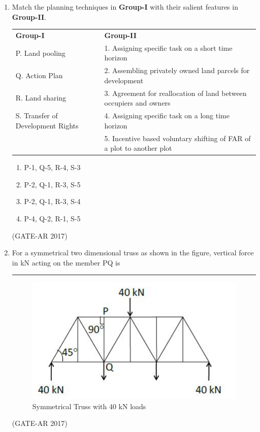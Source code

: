 \documentclass[a4paper,10pt]{article}
\begin{document}
\begin{enumerate}
    \item Match the planning techniques in \textbf{Group-I} with their salient features in \textbf{Group-II}. \\
    \begin{tabular}{ l l }
	\textbf{Group-I} & \textbf{Group-II} \\
	P. Land pooling & 1. Assigning specific task on a short time horizon \\
	Q. Action Plan & 2. Assembling privately owned land parcels for development \\
	R. Land sharing & 3. Agreement for reallocation of land between occupiers and owners \\
	S. Transfer of Development Rights & 4. Assigning specific task on a long time horizon \\
	& 5. Incentive based voluntary shifting of FAR of a plot to another plot \\
	\end{tabular}
	\begin{multicols}{2}
	\begin{enumerate}
        \item P-1, Q-5, R-4, S-3
        \item P-2, Q-1, R-3, S-5
        \item P-2, Q-1, R-3, S-4
        \item P-4, Q-2, R-1, S-5
    \end{enumerate}
	\end{multicols}
    \hfill (GATE-AR 2017)

    \item For a symmetrical two dimensional truss as shown in the figure, vertical force in kN acting on the member PQ is \rule{2cm}{0.4pt}
    \begin{figure}[h!]
        \centering
        \includegraphics[width=0.5\columnwidth]{figs/01.jpg}
        \caption{Symmetrical Truss with 40 kN loads}
	\label{fig:Img01}
	\end{figure}
    \hfill (GATE-AR 2017)


\end{enumerate}
\end{document}
